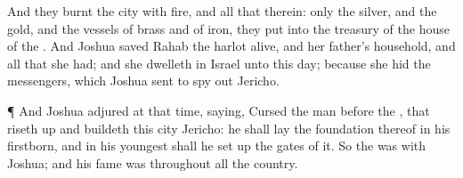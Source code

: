 {And they
burnt the
city with
fire, and all that
{} therein: only the
silver, and the
gold, and the
vessels of
brass and of
iron, they
put into the
treasury of the
house of the
{}.
And
Joshua
saved
Rahab the
harlot
alive, and her
father’s
household, and all that she had; and she
dwelleth
in
Israel
{} unto this
day; because she
hid the
messengers, which
Joshua
sent to spy
out
Jericho.
\par }{\PP {}¶ And
Joshua
adjured
{} at that
time,
saying,
Cursed
{} the
man
before the
{}, that riseth
up and
buildeth this
city
Jericho: he shall lay the
foundation thereof in his
firstborn, and in his
youngest
{} shall he set
up the
gates of it.
So the
{} was with
Joshua; and his
fame was
{} throughout all the
country.

}
